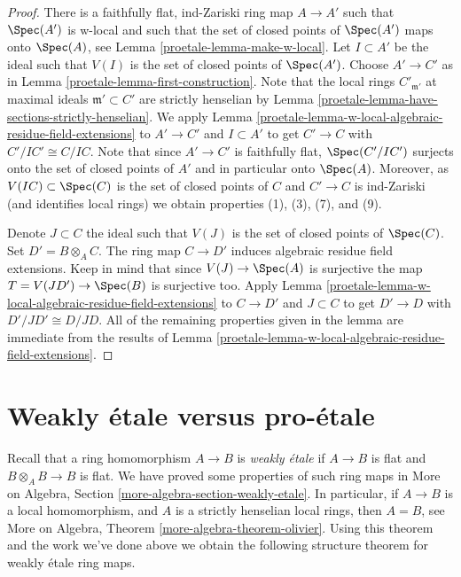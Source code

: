 \begin{proof}

There is a faithfully flat, ind-Zariski ring map $A \to A'$ such that
$\Spec(A')$ is w-local and such that the set of closed points of
$\Spec(A')$ maps onto $\Spec(A)$, see Lemma \ref{proetale-lemma-make-w-local}.
Let $I \subset A'$ be the ideal such that $V(I)$ is the set
of closed points of $\Spec(A')$.
Choose $A' \to C'$ as in Lemma \ref{proetale-lemma-first-construction}.
Note that the local rings $C'_{\mathfrak m'}$ at maximal ideals
$\mathfrak m' \subset C'$ are strictly henselian by
Lemma \ref{proetale-lemma-have-sections-strictly-henselian}.
We apply Lemma \ref{proetale-lemma-w-local-algebraic-residue-field-extensions}
to $A' \to C'$ and $I \subset A'$ to get $C' \to C$ with $C'/IC' \cong C/IC$.
Note that since $A' \to C'$ is faithfully flat, $\Spec(C'/IC')$
surjects onto the set of closed points of $A'$ and in particular
onto $\Spec(A)$. Moreover, as $V(IC) \subset \Spec(C)$
is the set of closed points of $C$ and $C' \to C$ is ind-Zariski
(and identifies local rings) we obtain properties (1), (3), (7), and (9).

\medskip\noindent
Denote $J \subset C$ the ideal such that $V(J)$ is the set of closed
points of $\Spec(C)$. Set $D' = B \otimes_A C$. The ring
map $C \to D'$ induces algebraic residue field extensions. Keep in mind that
since $V(J) \to \Spec(A)$ is surjective the map $T = V(JD') \to \Spec(B)$
is surjective too. Apply
Lemma \ref{proetale-lemma-w-local-algebraic-residue-field-extensions}
to $C \to D'$ and $J \subset C$ to get
$D' \to D$ with $D'/JD' \cong D/JD$.
All of the remaining properties given in the lemma are
immediate from the results of
Lemma \ref{proetale-lemma-w-local-algebraic-residue-field-extensions}.
\end{proof}

\section{Weakly \'etale versus pro-\'etale}
\label{proetale-section-weakly-etale}
Recall that a ring homomorphism $A \to B$ is {\it weakly \'etale}
if $A \to B$ is flat and $B \otimes_A B \to B$ is flat. We have
proved some properties of such ring maps in
More on Algebra, Section \ref{more-algebra-section-weakly-etale}.
In particular, if $A \to B$ is a local homomorphism, and $A$ is a
strictly henselian local rings, then $A = B$, see
More on Algebra, Theorem \ref{more-algebra-theorem-olivier}.
Using this theorem and the work we've done above we obtain
the following structure theorem for weakly \'etale ring maps.

